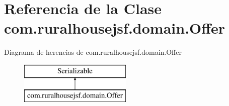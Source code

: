 \hypertarget{classcom_1_1ruralhousejsf_1_1domain_1_1_offer}{}\section{Referencia de la Clase com.\+ruralhousejsf.\+domain.\+Offer}
\label{classcom_1_1ruralhousejsf_1_1domain_1_1_offer}
Diagrama de herencias de com.\+ruralhousejsf.\+domain.\+Offer\begin{figure}[H]
\begin{center}
\leavevmode
\includegraphics[height=2.000000cm]{classcom_1_1ruralhousejsf_1_1domain_1_1_offer}
\end{center}
\end{figure}
